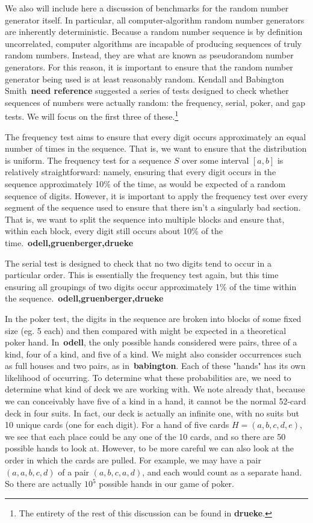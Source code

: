 \documentclass[12pt]{article}
\numberwithin{equation}{section}
\begin{document}
\par We also will include here a discussion of benchmarks for the random number generator itself.  In particular, all computer-algorithm random number generators are inherently deterministic.  Because a random number sequence is by definition uncorrelated, computer algorithms are incapable of producing sequences of truly random numbers. Instead, they are what are known as pseudorandom number generators.  For this reason, it is important to ensure that the random number generator being used is at least reasonably random.  Kendall and Babington Smith~\textbf{need reference} suggested a series of tests designed to check whether sequences of numbers were actually random: the frequency, serial, poker, and gap tests.  We will focus on the first three of these.\footnote{The entirety of the rest of this discussion can be found in \textbf{drueke}.}  
\par The frequency test aims to ensure that every digit occurs approximately an equal number of times in the sequence.  That is, we want to ensure that the distribution is uniform.  The frequency test for a sequence $S$ over some interval $[a,b]$ is relatively straightforward: namely, ensuring that every digit occurs in the sequence approximately 10\% of the time, as would be expected of a random sequence of digits.  However, it is important to apply the frequency test over every segment of the sequence used to ensure that there isn't a singularly bad section.  That is, we want to split the sequence into multiple blocks and ensure that, within each block, every digit still occurs about 10\% of the time.~\textbf{odell,gruenberger,drueke}
\par The serial test is designed to check that no two digits tend to occur in a particular order. This is essentially the frequency test again, but this time ensuring all groupings of two digits occur approximately 1\% of the time within the sequence.~\textbf{odell,gruenberger,drueke}
\par In the poker test, the digits in the sequence are broken into blocks of some fixed size (eg. 5 each) and then compared with might be expected in a theoretical poker hand.  In~\textbf{odell}, the only possible hands considered were pairs, three of a kind, four of a kind, and five of a kind.  We might also consider occurrences such as full houses and two pairs, as in~\textbf{babington}.  Each of these "hands" has its own likelihood of occurring.  To determine what these probabilities are, we need to determine what kind of deck we are working with.  We note already that, because we can conceivably have five of a kind in a hand, it cannot be the normal 52-card deck in four suits.  In fact, our deck is actually an infinite one, with no suits but 10 unique cards (one for each digit).  For a hand of five cards $H=(a,b,c,d,e)$, we see that each place could be any one of the 10 cards, and so there are 50 possible hands to look at.  However, to be more careful we can also look at the order in which the cards are pulled.  For example, we may have a pair $(a,a,b,c,d)$ of a pair $(a,b,c,a,d)$, and each would count as a separate hand.  So there are actually $10^{5}$ possible hands in our game of poker.  
\end{document}
